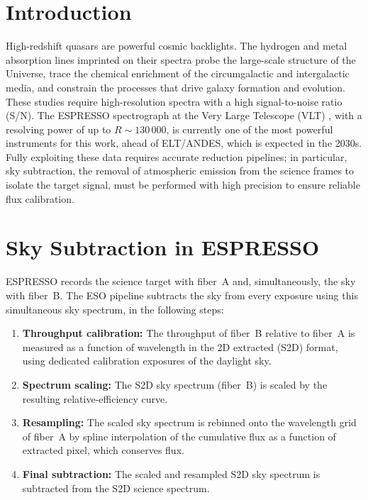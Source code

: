 \documentclass[11pt,twoside]{article}
\begin{document}

\section{Introduction}
High-redshift quasars are powerful cosmic backlights. The hydrogen and metal absorption lines imprinted on their spectra probe the large-scale structure of the Universe, trace the chemical enrichment of the circumgalactic and intergalactic media, and constrain the processes that drive galaxy formation and evolution. These studies require high-resolution spectra with a high signal-to-noise ratio (S/N). The ESPRESSO spectrograph at the Very Large Telescope (VLT) \citep{pepe+21}, with a resolving power of up to $R\sim130\,000$, is currently one of the most powerful instruments for this work, ahead of ELT/ANDES, which is expected in the 2030s. Fully exploiting these data requires accurate reduction pipelines; in particular, sky subtraction, the removal of atmospheric emission from the science frames to isolate the target signal, must be performed with high precision to ensure reliable flux calibration.

\section{Sky Subtraction in ESPRESSO}
ESPRESSO records the science target with fiber~A and, simultaneously, the sky with fiber~B. The ESO pipeline subtracts the sky from every exposure using this simultaneous sky spectrum, in the following steps:

\begin{enumerate}
    \item \textbf{Throughput calibration:} The throughput of fiber~B relative to fiber~A is measured as a function of wavelength in the 2D extracted (S2D) format, using dedicated calibration exposures of the daylight sky.
    \item \textbf{Spectrum scaling:} The S2D sky spectrum (fiber~B) is scaled by the resulting relative-efficiency curve.
    \item \textbf{Resampling:} The scaled sky spectrum is rebinned onto the wavelength grid of fiber~A by spline interpolation of the cumulative flux as a function of extracted pixel, which conserves flux.
    \item \textbf{Final subtraction:} The scaled and resampled S2D sky spectrum is subtracted from the S2D science spectrum.
\end{enumerate}
\end{document}
